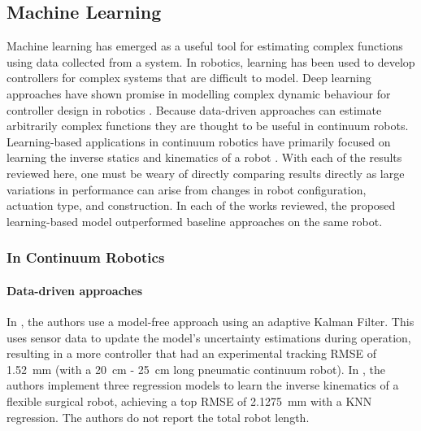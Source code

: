 \subsection{Machine Learning}
Machine learning has emerged as a useful tool for estimating complex functions using data collected from a system. In robotics, learning has been used to develop controllers for complex systems that are difficult to model. Deep learning approaches have shown promise in modelling complex dynamic behaviour for controller design in robotics \cite{9199280}. Because data-driven approaches can estimate arbitrarily complex functions \cite{HORNIK1989359} they are thought to be useful in continuum robots. Learning-based applications in continuum robotics have primarily focused on learning the inverse statics and kinematics of a robot \cite{10.3389/frobt.2021.730330}. With each of the results reviewed here, one must be weary of directly comparing results directly as large variations in performance can arise from changes in robot configuration, actuation type, and construction. In each of the works reviewed, the proposed learning-based model outperformed baseline approaches on the same robot.

\subsubsection{In Continuum Robotics}
\paragraph{Data-driven approaches}
 In \cite{8115276}, the authors use a model-free approach using an adaptive Kalman Filter. This uses sensor data to update the model's uncertainty estimations during operation, resulting in a more controller that had an experimental tracking RMSE of \SI{1.52}{mm} (with a \SI{20}{cm} - \SI{25}{cm} long pneumatic continuum robot). In \cite{rcs.1774}, the authors implement three regression models to learn the inverse kinematics of a flexible surgical robot, achieving a top RMSE of \SI{2.1275}{mm} with a KNN regression. The authors do not report the total robot length. 

